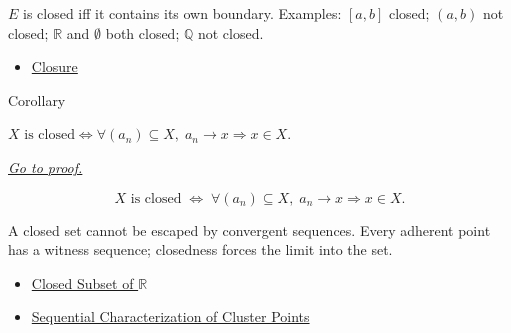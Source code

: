 \begin{remark*}[Interpretation]
$E$ is closed iff it contains its own boundary. Examples:
$[a,b]$ closed; $(a,b)$ not closed; $\mathbb{R}$ and $\emptyset$
both closed; $\mathbb{Q}$ not closed.
\end{remark*}

\begin{dependencies}
\begin{itemize}
  \item \hyperref[def:closure-r]{Closure}
\end{itemize}
\end{dependencies}


\begin{corollarybox}{Corollary}
\begin{corollary}
\label{cor:closed-iff-seq-limits}
$X\text{ is closed} \iff \forall (a_n)\subseteq X,\;
a_n \to x \Rightarrow x \in X$.

\smallskip\noindent
\hyperref[prf:closed-iff-seq-limits]{\textit{Go to proof.}}
\end{corollary}
\end{corollarybox}

\begin{remark*}
\[
  X\text{ is closed}
  \;\iff\;
  \forall (a_n)\subseteq X,\;
  a_n\to x
  \Rightarrow x \in X.
\]
\end{remark*}

\begin{remark*}[Interpretation]
A closed set cannot be escaped by convergent sequences. Every adherent
point has a witness sequence; closedness forces the limit into the set.
\end{remark*}

\begin{dependencies}
\begin{itemize}
  \item \hyperref[def:closed-set-r]{Closed Subset of $\mathbb{R}$}
  \item \hyperref[thm:cluster-point-sequential]{Sequential Characterization of Cluster Points}
\end{itemize}
\end{dependencies}

